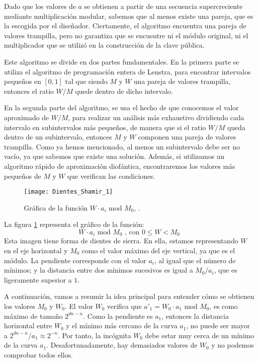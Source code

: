     Dado que los valores de $a$ se obtienen a partir de una secuencia supercreciente mediante multiplicación modular, sabemos que al menos existe una pareja, que es la escogida por el diseñador. Ciertamente, el algoritmo encuentra una pareja de valores trampilla, pero no garantiza que se encuentre ni el módulo original, ni el multiplicador que se utilizó en la construcción de la clave pública.

    Este algoritmo se divide en dos partes fundamentales. En la primera parte se utiliza el algoritmo de programación entera de Lenstra, para encontrar intervalos pequeños en $[0, 1]$ tal que siendo $M$ y $W$ una pareja de valores trampilla, entonces el ratio $W/M$ quede dentro de dicho intervalo.
    
    En la segunda parte del algoritmo, se usa el hecho de que conocemos el valor aproximado de $W/M$, para realizar un análisis más exhaustivo dividiendo cada intervalo en subintervalos más pequeños, de manera que si el ratio $W/M$ queda dentro de un subintervalo, entonces $M$ y $W$ componen una pareja de valores trampilla. Como ya hemos mencionado, al menos un subintervalo debe ser no vacío, ya que sabemos que existe una solución. Además, si utilizamos un algoritmo rápido de aproximación diofántica, encontraremos los valores más pequeños de $M$ y $W$ que verifican las condiciones.

    \begin{figure}[H]
        \centering
        \texttt{[image: Dientes\_Shamir\_1]}
        \caption{Gráfica de la función $W \cdot a_{i} \text{ mod } M_{0}$, \cite{artSha}.}
        \label{fig:4.1}
    \end{figure}

    La figura \ref{fig:4.1} representa el gráfico de la función:
    \begin{equation}
        W \cdot a_{i} \text{ mod } M_{0} \text{ , con } 0 \leq W < M_{0}
    \end{equation}
    Esta imagen tiene forma de dientes de sierra. En ella, estamos representando $W$ en el eje horizontal y $M_{0}$ como el valor máximo del eje vertical, ya que es el módulo. La pendiente corresponde con el valor $a_{i}$, al igual que el número de mínimos; y la distancia entre dos mínimos sucesivos es igual a $M_{0}/a_{i}$, que es ligeramente superior a $1$.

    A continuación, vamos a resumir la idea principal para entender cómo se obtienen los valores $M_{0}$ y $W_{0}$. El valor $W_{0}$ verifica que $a'_{1} = W_{0} \cdot a_{1} \text{ mod } M_{0}$, es como máximo de tamaño $2^{dn - n}$. Como la pendiente es $a_{1}$, entonces la distancia horizontal entre $W_{0}$ y el mínimo más cercano de la curva $a_{1}$, no puede ser mayor a $2^{dn - n} / a_{1} \approx 2^{-n}$. Por tanto, la incógnita $W_{0}$ debe estar muy cerca de un mínimo de la curva $a_{1}$. Desafortunadamente, hay demasiados valores de $W_{0}$ y no podemos comprobar todos ellos.


